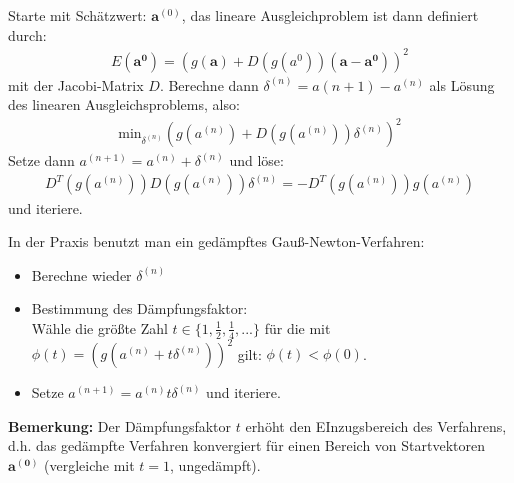 \documentclass{scrartcl}
\begin{document}
Starte mit Schätzwert: $\boldsymbol{a}^{(0)}$, das lineare Ausgleichproblem ist dann definiert durch:
\begin{align*}
E(\boldsymbol{a^0}) = (g(\boldsymbol{a})+ D(g(a^0))(\boldsymbol{a}-\boldsymbol{a^0}))^2
\end{align*}
mit der Jacobi-Matrix $D$.
Berechne dann $\delta^{(n)}=a{(n+1)}-a^{(n)}$ als Lösung des linearen Ausgleichsproblems, also:
\begin{align*}
\text{min}_{\delta^{(n)}}(g(a^{(n)})+D(g(a^{(n)})) \delta^{(n)})^2
\end{align*}
Setze dann $a^{(n+1)}= a^{(n)}+ \delta ^{(n)}$ und löse:
\begin{align*}
D^T(g(a^{(n)})) D(g(a^{(n)})) \delta^{(n)} = - D^T(g(a^{(n)})) g(a^{(n)})
\end{align*}
und iteriere. 

In der Praxis benutzt man ein gedämpftes Gauß-Newton-Verfahren:
\begin{itemize}
\item Berechne wieder $\delta^{(n)}$
\item Bestimmung des Dämpfungsfaktor: \\
Wähle die größte Zahl $t \in \{1, \frac{1}{2}, \frac{1}{4},...\}$ für die mit $\phi(t)=(g(a^{(n)}+t \delta^{(n)}))^2$ gilt: $\phi(t) < \phi(0)$.
\item Setze $a^{(n+1)} = a^{(n)} t \delta^{(n)}$ und iteriere.
\end{itemize}
\textbf{Bemerkung:} Der Dämpfungsfaktor $t$ erhöht den EInzugsbereich des Verfahrens, d.h. das gedämpfte Verfahren konvergiert für einen Bereich von Startvektoren $\boldsymbol{a^{(0)}}$ (vergleiche mit $t=1$, ungedämpft).
\end{document}
